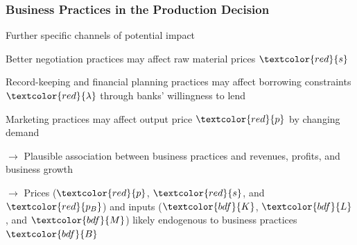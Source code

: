 \documentclass[hideothersubsections, usenames,dvipsnames,11pt]{beamer}
\newenvironment{itemize_2pt}{\itemize\addtolength{\itemsep}{2pt}}{\enditemize}
\newenvironment{enumerate_2pt}{\enumerate\addtolength{\itemsep}{2pt}}{\endenumerate}
\begin{document}
\begin{frame}
\frametitle{Business Practices in the Production Decision}

\begin{itemize_2pt}

	\item \normalsize Further specific channels of potential impact
	\begin{enumerate_2pt}
		\item Better \textcolor{bdf}{negotiation practices} may affect raw material prices $\textcolor{red}{s}$
		\item \textcolor{bdf}{Record-keeping} and \textcolor{bdf}{financial planning practices} may affect borrowing constraints $\textcolor{red}{\lambda}$ through banks' willingness to lend \citep[see, e.g.][]{Bruhn2013}
		\item \textcolor{bdf}{Marketing practices} may affect output price $\textcolor{red}{p}$ by changing demand

\vspace{1.0em}

		\item[] $\rightarrow$ Plausible association between business practices and revenues, profits, and business growth
		
\vspace{0.5em}		
		
		\item[] $\rightarrow$ Prices ($\textcolor{red}{p}$, $\textcolor{red}{s}$, and $\textcolor{red}{p_{B}}$) and inputs ($\textcolor{bdf}{K}$, $\textcolor{bdf}{L}$, and $\textcolor{bdf}{M}$) likely endogenous to business practices $\textcolor{bdf}{B}$
	\end{enumerate_2pt}
\end{itemize_2pt}

\end{frame}
\end{document}
